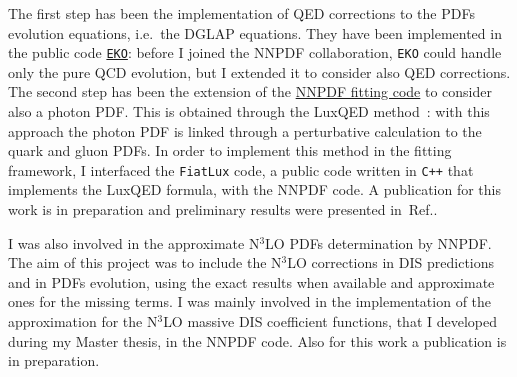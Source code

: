 \documentclass[11pt,a4paper]{moderncv}        %
\begin{document}
The first step has been the implementation of QED corrections to the PDFs evolution equations, i.e.\ the DGLAP equations.
They have been implemented in the public code \href{https://github.com/NNPDF/eko}{\texttt{EKO}}:
before I joined the NNPDF collaboration, \texttt{EKO} could handle only the pure QCD evolution, but I extended it to consider also QED corrections.
%
The second step has been the extension of the \href{https://github.com/NNPDF/nnpdf}{NNPDF fitting code} to consider also
a photon PDF.
This is obtained through the LuxQED method~\cite{Manohar:2016nzj, Manohar:2017eqh}: with this approach the photon PDF is linked through
a perturbative calculation to the quark and gluon PDFs.
In order to implement this method in the fitting framework, I interfaced the \texttt{FiatLux} code, 
a public code written in \texttt{C++} that implements the LuxQED formula, with the NNPDF code.
A publication for this work is in preparation and preliminary results were presented in~Ref.\cite{LAURENTI2023}.

I was also involved in the approximate N$^3$LO PDFs determination by NNPDF.
The aim of this project was to include the N$^3$LO corrections in DIS predictions and in PDFs evolution,
using the exact results when available and approximate ones for the missing terms.
I was mainly involved in the implementation of the approximation for the N$^3$LO massive DIS coefficient functions, that I developed
during my Master thesis, in the NNPDF code.
Also for this work a publication is in preparation.
\end{document}
